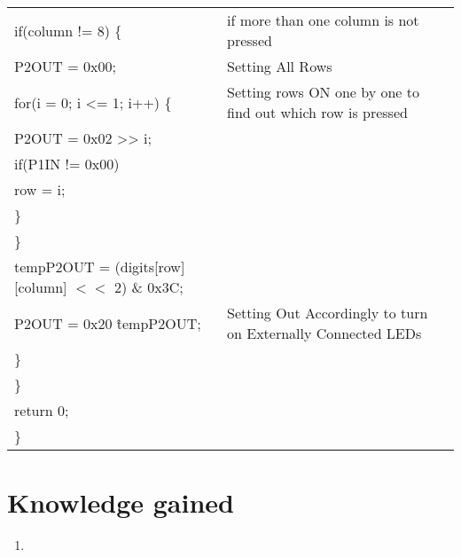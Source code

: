 \documentclass[12pt, letterpaper]{article}
\begin{document}
\begin{longtable}{|p{8cm}||p{6cm}|}
            \hspace{0.3cm}    if(column != 8) \{  & if more than one column is not pressed \\
            \hspace{0.5cm}     P2OUT = 0x00; & Setting All Rows \\
            \hspace{0.5cm}    for(i = 0; i <= 1; i++) \{ & Setting rows ON one by one to find out which row is pressed\\
            \hspace{0.7cm}    P2OUT = 0x02 >> i; & \\
            \hspace{0.7cm}    if(P1IN != 0x00) & \\
            \hspace{0.9cm}    row = i;     &  \\
            \hspace{0.7cm}    \} & \\
            \hspace{0.5cm}    \} & \\
            \hspace{0.3cm}    tempP2OUT = (digits[row][column] $<<$ 2) \& 0x3C; & \\
            \hspace{0.3cm}    P2OUT = 0x20 \^ tempP2OUT; &  Setting Out Accordingly to turn on Externally Connected LEDs\\
            \hspace{0.3cm}    \} & \\

            \hspace{0.1cm}    \} & \\
            \hspace{0.1cm}     return 0; & \\
            \} & \\

\end{longtable}



\section{Knowledge gained}

\begin{enumerate}
	\item 
\end{enumerate}
\end{document}
